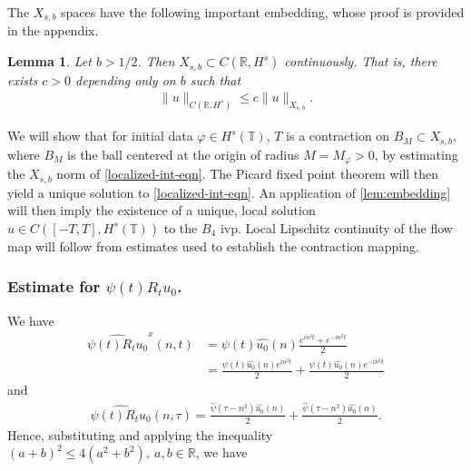 \documentclass[12pt,reqno]{amsart}
\numberwithin{equation}{section}  %
\numberwithin{figure}{section}
\newcommand{\rr}{\mathbb{R}}
\newcommand{\ci}{\mathbb{T}}
\newcommand{\wh}{\widehat}
\newcommand{\vp}{\varphi}
\theoremstyle{plain}
\newtheorem{lemma}{Lemma}
\theoremstyle{definition}
\theoremstyle{remark}
\begin{document}
%
The $X_{s,b}$ spaces have the following important embedding, whose proof is
provided in the appendix.
%
%
%
%
%
%
%
%
\begin{lemma}
  Let $b > 1/2$. Then $X_{s, b} \subset C(\rr, H^s)$ continuously. That is, there exists $c>0$ depending only on $b$ such that
%
%
\begin{equation*}
\begin{split}
  \| u \|_{C(\rr, H^s) } \le c \| u \|_{X_{s,b}}.
\end{split}
\end{equation*}
%
\label{lem:embedding}
\end{lemma}
%
%
We will 
show that for initial data $\vp \in {H}^s(\ci)$, $T$ is a contraction on $B_M 
\subset {X}_{s,b}$, where $B_M$ is the ball centered at the origin of radius $M = 
M_{\vp}> 0$, by estimating the $X_{s,b}$
norm of \eqref{localized-int-eqn}. The Picard fixed point theorem will
then yield a unique solution to
\eqref{localized-int-eqn}. An application of \autoref{lem:embedding}
will then imply the existence of a unique, local
solution $u \in C([-T, T], H^s(\ci))$ to the $B_4$ ivp. Local Lipschitz continuity of the flow map will follow from estimates used to establish the contraction mapping. %
%
%
%
%
%
%
%
%
%
\subsubsection{Estimate for $\psi(t) R_{t}u_{0}$.} 
\label{sssec:est-init-term-1}
We have
%
%
\begin{equation*}
  \begin{split}
    \wh{\psi(t)R_{t}u_{0}}^{x}(n, t)
    & = \psi(t) \wh{u_{0}}(n) \frac{e^{in^2 t} + e^{-in^{2}t}}{2}
    \\
    & = \frac{\psi(t) \wh{u_{0}}(n)e^{in^{2}t}}{2} + \frac{\psi(t)
    \wh{u_{0}}(n)e^{-in^{2}t}}{2}  
  \end{split}
\end{equation*}
%
%
and
%
%
\begin{equation*}
  \begin{split}
    \wh{\psi(t) R_{t}u_{0}}(n, \tau) = \frac{\wh{\psi}(\tau -
    n^{2})\wh{u_{0}}(n)}{2} + \frac{\wh{\psi}(\tau - n^{2})\wh{u_{0}}(n)}{2}.
  \end{split}
\end{equation*}
%
%
Hence, substituting and applying the inequality $(a + b)^{2} \le 4(a^{2} +
b^{2}),\ a, b \in \rr$, we have
\end{document}
